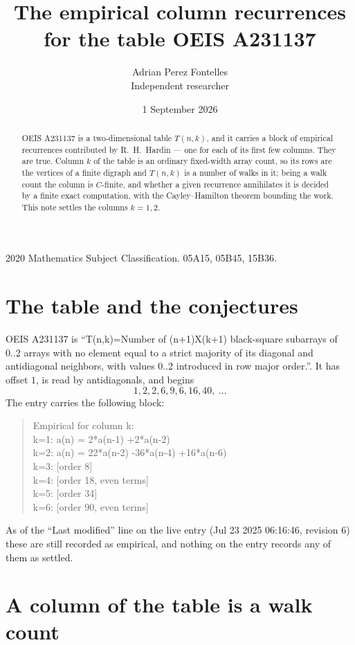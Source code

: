 \documentclass[11pt,a4paper]{article}
\title{The empirical column recurrences for the table OEIS A231137}
\author{Adrian Perez Fontelles\\ \small Independent researcher}
\date{1 September 2026}
\theoremstyle{plain}
\theoremstyle{definition}
\begin{document}
\maketitle

\begin{abstract}
OEIS A231137 is a two-dimensional table $T(n,k)$, and it carries a block of empirical
recurrences contributed by R.~H.~Hardin --- one for each of its first few columns. They are
true. Column $k$ of the table is an ordinary fixed-width array count, so its rows are the
vertices of a finite digraph and $T(n,k)$ is a number of walks in it; being a walk count the
column is $C$-finite, and whether a given recurrence annihilates it is decided by a finite
exact computation, with the Cayley--Hamilton theorem bounding the work. This note settles the columns $k=1, 2$.
\end{abstract}

\noindent\small 2020 Mathematics Subject Classification. 05A15, 05B45, 15B36.\normalsize

\section{The table and the conjectures}

OEIS A231137 is ``T(n,k)=Number of (n+1)X(k+1) black-square subarrays of 0..2 arrays with no element equal to a strict majority of its diagonal and antidiagonal neighbors, with values 0..2 introduced in row major order.''. It has offset $1$, is
read by antidiagonals, and begins
\[
1, 2, 2, 6, 9, 6, 16, 40,\ \dots
\]
The entry carries the following block:
\begin{quote}\small
Empirical for column k:\\
k=1: a(n) = 2*a(n-1) +2*a(n-2)\\
k=2: a(n) = 22*a(n-2) -36*a(n-4) +16*a(n-6)\\
k=3: [order 8]\\
k=4: [order 18, even terms]\\
k=5: [order 34]\\
k=6: [order 90, even terms]\\
\end{quote}
As of the ``Last modified'' line on the live entry (Jul 23 2025 06:16:46, revision 6) these are still
recorded as empirical, and nothing on the entry records any of them as settled.

\section{A column of the table is a walk count}
\end{document}
